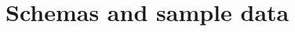 





 \label{sec:milestone1}

  

  \section{Schemas and sample data}\label{sub:schemas} %
  
  
  

  

 \label{sec:milestone2}

  



